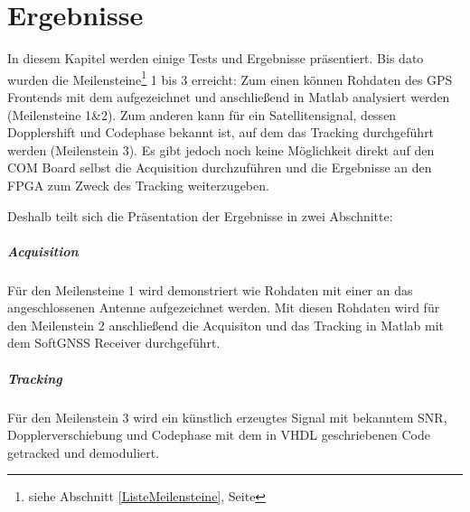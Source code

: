 \chapter{Ergebnisse}

In diesem Kapitel werden einige Tests und Ergebnisse präsentiert. Bis dato wurden die Meilensteine\footnote{siehe Abschnitt \ref{ListeMeilensteine}, Seite \pageref{ListeMeilensteine}} 1 bis 3 erreicht: Zum einen können Rohdaten des GPS Frontends mit dem \comboard aufgezeichnet und anschließend in Matlab analysiert werden (Meilensteine 1\&2). Zum anderen kann für ein Satellitensignal, dessen Dopplershift und Codephase bekannt ist, auf dem \comboard das Tracking durchgeführt werden (Meilenstein 3). Es gibt jedoch noch keine Möglichkeit direkt auf den COM Board selbst die Acquisition durchzuführen und die Ergebnisse an den FPGA zum Zweck des Tracking weiterzugeben.

Deshalb teilt sich die Präsentation der Ergebnisse in zwei Abschnitte: 

\paragraph{Acquisition} Für den Meilensteine 1 wird demonstriert wie Rohdaten mit einer an das  \comboard angeschlossenen Antenne aufgezeichnet werden. Mit diesen Rohdaten wird für den Meilenstein 2 anschließend die Acquisiton und das Tracking in Matlab mit dem SoftGNSS Receiver durchgeführt.

\paragraph{Tracking} Für den Meilenstein 3 wird ein künstlich erzeugtes Signal mit bekanntem SNR, Dopplerverschiebung und Codephase mit dem in VHDL geschriebenen Code getracked und demoduliert.







